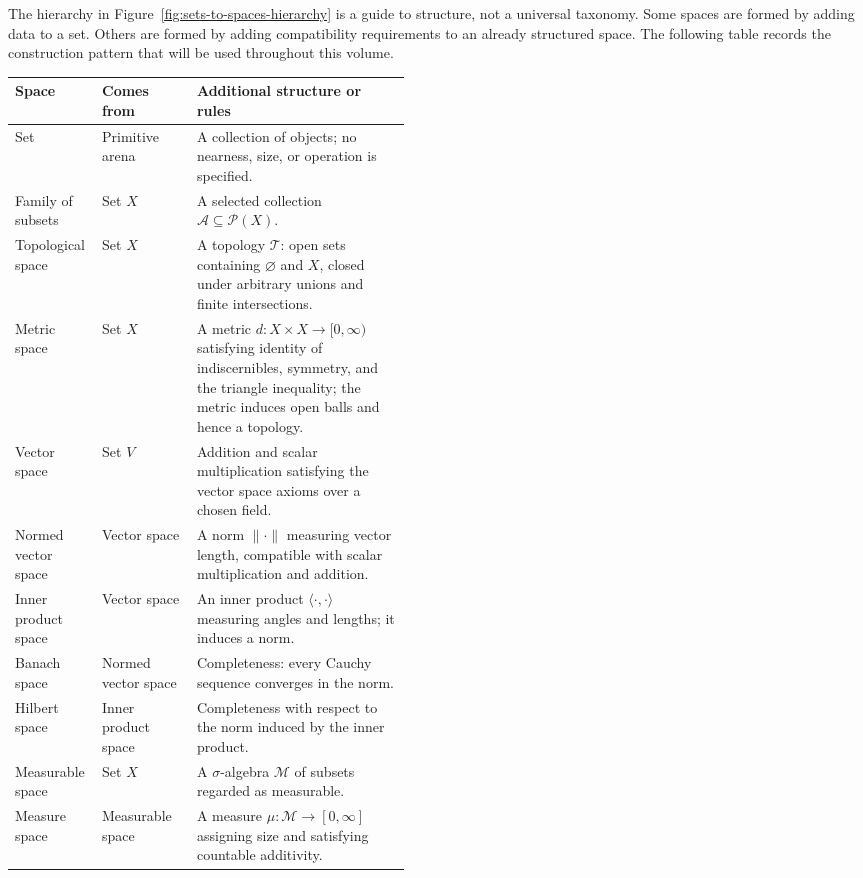 \begin{remark*}[Exposition]
The hierarchy in Figure~\ref{fig:sets-to-spaces-hierarchy} is a guide to
structure, not a universal taxonomy.  Some spaces are formed by adding data to
a set.  Others are formed by adding compatibility requirements to an already
structured space.  The following table records the construction pattern that
will be used throughout this volume.
\end{remark*}

\begin{remark*}
\begin{center}
\small
\renewcommand{\arraystretch}{1.2}
\begin{tabularx}{\linewidth}{>{\raggedright\arraybackslash}p{0.22\linewidth}
                            >{\raggedright\arraybackslash}p{0.24\linewidth}
                            >{\raggedright\arraybackslash}X}
\toprule
\textbf{Space} & \textbf{Comes from} & \textbf{Additional structure or rules} \\
\midrule
Set & Primitive arena & A collection of objects; no nearness, size, or
operation is specified. \\
Family of subsets & Set \(X\) & A selected collection
\(\mathcal{A}\subseteq\mathcal{P}(X)\). \\
Topological space & Set \(X\) & A topology \(\mathcal{T}\): open sets
containing \(\varnothing\) and \(X\), closed under arbitrary unions and finite
intersections. \\
Metric space & Set \(X\) & A metric \(d:X\times X\to[0,\infty)\) satisfying
identity of indiscernibles, symmetry, and the triangle inequality; the metric
induces open balls and hence a topology. \\
Vector space & Set \(V\) & Addition and scalar multiplication satisfying the
vector space axioms over a chosen field. \\
Normed vector space & Vector space & A norm \(\lVert\cdot\rVert\) measuring vector
length, compatible with scalar multiplication and addition. \\
Inner product space & Vector space & An inner product \(\langle\cdot,\cdot\rangle\)
measuring angles and lengths; it induces a norm. \\
Banach space & Normed vector space & Completeness: every Cauchy sequence
converges in the norm. \\
Hilbert space & Inner product space & Completeness with respect to the norm
induced by the inner product. \\
Measurable space & Set \(X\) & A \(\sigma\)-algebra \(\mathcal{M}\) of subsets
regarded as measurable. \\
Measure space & Measurable space & A measure \(\mu:\mathcal{M}\to[0,\infty]\)
assigning size and satisfying countable additivity. \\
\bottomrule
\end{tabularx}
\end{center}
\end{remark*}
